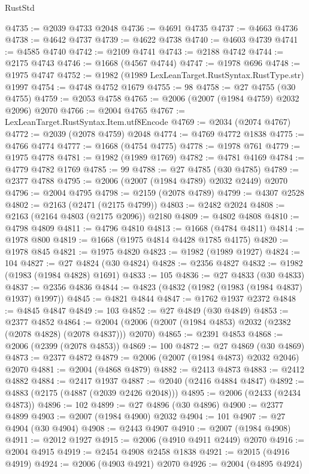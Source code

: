 \begin{lexlean}{RustStd}
\begin{coremodule}
@4735 := @2039 @4733 @2048
@4736 := @4691 @4735
@4737 := @4663 @4736
@4738 := @4642 @4737
@4739 := @4622 @4738
@4740 := @4603 @4739
@4741 := @4585 @4740
@4742 := @2109 @4741
@4743 := @2188 @4742
@4744 := @2175 @4743
@4746 := @1668 (@4567 @4744)
@4747 := @1978 @696
@4748 := @1975 @4747
@4752 := @1982 (@1989 LexLeanTarget.RustSyntax.RustType.str) @1997
@4754 := @4748 @4752 @1679
@4755 := 98
@4758 := @27 @4755 (@30 @4755)
@4759 := @2053 @4758
@4765 := @2006 (@2007 (@1984 @4759) @2032 @2096) @2070
@4766 := @2004 @4765
@4767 := LexLeanTarget.RustSyntax.Item.utf8Encode
@4769 := @2034 (@2074 @4767)
@4772 := @2039 (@2078 @4759) @2048
@4774 := @4769 @4772 @1838
@4775 := @4766 @4774
@4777 := @1668 (@4754 @4775)
@4778 := @1978 @761
@4779 := @1975 @4778
@4781 := @1982 (@1989 @1769)
@4782 := @4781 @4169
@4784 := @4779 @4782 @1769
@4785 := 99
@4788 := @27 @4785 (@30 @4785)
@4789 := @2377 @4788
@4795 := @2006 (@2007 (@1984 @4789) @2032 @2449) @2070
@4796 := @2004 @4795
@4798 := @2159 (@2078 @4789)
@4799 := @4307 @2528
@4802 := @2163 (@2471 (@2175 @4799))
@4803 := @2482 @2024
@4808 := @2163 (@2164 @4803 (@2175 @2096)) @2180
@4809 := @4802 @4808
@4810 := @4798 @4809
@4811 := @4796 @4810
@4813 := @1668 (@4784 @4811)
@4814 := @1978 @800
@4819 := @1668 (@1975 @4814 @4428 @1785 @4175)
@4820 := @1978 @845
@4821 := @1975 @4820
@4823 := @1982 (@1989 @1927)
@4824 := 104
@4827 := @27 @4824 (@30 @4824)
@4828 := @2356 @4827
@4832 := @1982 (@1983 (@1984 @4828) @1691)
@4833 := 105
@4836 := @27 @4833 (@30 @4833)
@4837 := @2356 @4836
@4844 := @4823 (@4832 (@1982 (@1983 (@1984 @4837) @1937) @1997))
@4845 := @4821 @4844
@4847 := @1762 @1937 @2372
@4848 := @4845 @4847
@4849 := 103
@4852 := @27 @4849 (@30 @4849)
@4853 := @2377 @4852
@4864 := @2004 (@2006 (@2007 (@1984 @4853) @2032 (@2382 (@2078 @4828) (@2078 @4837))) @2070)
@4865 := @2391 @4853
@4868 := @2006 (@2399 (@2078 @4853))
@4869 := 100
@4872 := @27 @4869 (@30 @4869)
@4873 := @2377 @4872
@4879 := @2006 (@2007 (@1984 @4873) @2032 @2046) @2070
@4881 := @2004 (@4868 @4879)
@4882 := @2413 @4873
@4883 := @2412 @4882
@4884 := @2417 @1937
@4887 := @2040 (@2416 @4884 @4847)
@4892 := @4883 (@2175 (@4887 (@2039 @2426 @2048)))
@4895 := @2006 (@2433 (@2434 @4873))
@4896 := 102
@4899 := @27 @4896 (@30 @4896)
@4900 := @2377 @4899
@4903 := @2007 (@1984 @4900) @2032
@4904 := 101
@4907 := @27 @4904 (@30 @4904)
@4908 := @2443 @4907
@4910 := @2007 (@1984 @4908)
@4911 := @2012 @1927
@4915 := @2006 (@4910 @4911 @2449) @2070
@4916 := @2004 @4915
@4919 := @2454 @4908 @2458 @1838
@4921 := @2015 (@4916 @4919)
@4924 := @2006 (@4903 @4921) @2070
@4926 := @2004 (@4895 @4924)

\end{coremodule}
\end{lexlean}
